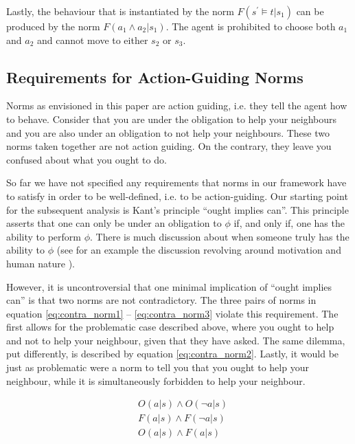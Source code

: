 Lastly, the behaviour that is instantiated by the norm $F(s^{\prime} \vDash t | s_1)$ can be produced by the norm $F(a_1 \wedge a_2 | s_1)$. The agent is prohibited to choose both $a_1$ and $a_2$ and cannot move to either $s_2$ or $s_3$.

\subsection{Requirements for Action-Guiding Norms}
\label{sec:action_guiding}

Norms as envisioned in this paper are action guiding, i.e. they tell the agent how to behave. Consider that you are under the obligation to help your neighbours and you are also under an obligation to not help your neighbours. These two norms taken together are not action guiding. On the contrary, they leave you confused about what you ought to do.

So far we have not specified any requirements that norms in our framework have to satisfy in order to be well-defined, i.e. to be action-guiding. Our starting point for the subsequent analysis is Kant's principle %
``ought implies can''. This principle asserts that one can only be under an obligation to $\phi$ if, and only if, one has the ability to perform $\phi$. There is much discussion about when someone truly has the ability to $\phi$ (see for an example the discussion revolving around motivation and human nature \citep{estlund2011human}).

However, it is uncontroversial that one minimal implication of ``ought implies can'' is that two norms are not contradictory. The three pairs of norms in equation \eqref{eq:contra_norm1} -- \eqref{eq:contra_norm3} violate this requirement. The first allows for the problematic case described above, where you ought to help and not to help your neighbour, given that they have asked. The same dilemma, put differently, is described by equation \eqref{eq:contra_norm2}. Lastly, it would be just as problematic were a norm to tell you that you ought to help your neighbour, while it is simultaneously forbidden to help your neighbour. 

\begin{align}
	&O(a | s) \wedge O(\neg a | s) \label{eq:contra_norm1}\\
	&F(a | s) \wedge F(\neg a | s) \label{eq:contra_norm2}\\
	&O(a | s) \wedge F(a | s) \label{eq:contra_norm3}
\end{align}

